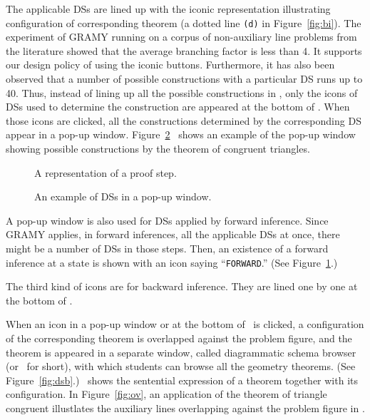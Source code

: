 The applicable DSs are lined up with the iconic representation
illustrating configuration of corresponding theorem (a dotted line
\texttt{(d)} in Figure~\ref{fig:bi}).  The experiment of GRAMY running
on a corpus of non-auxiliary line problems from the literature showed
that the average branching factor is less than 4.  It supports our
design policy of using the iconic buttons.  Furthermore, it has also
been observed that a number of possible constructions with a particular
DS runs up to 40.  Thus, instead of lining up all the possible
constructions in \StateView, only the icons of DSs used to determine the
construction are appeared at the bottom of \StateView.  When those icons
are clicked, all the constructions determined by the corresponding DS
appear in a pop-up window.  Figure~\ref{fig:popup}~ shows an example of
the pop-up window showing possible constructions by the theorem of
congruent triangles.

\begin{figure}[tb]
 \center
 \caption{A representation of a proof step.}
 \label{fig:sv}
\end{figure}

\begin{figure}[tb]
 \center
 \caption{An example of DSs in a pop-up window.}
 \label{fig:popup}
\end{figure}

A pop-up window is also used for DSs applied by forward inference.
Since GRAMY applies, in forward inferences, all the applicable DSs at
once, there might be a number of DSs in those steps.  Then, an existence
of a forward inference at a state is shown with an icon saying
``\texttt{FORWARD}.''  (See Figure~\ref{fig:sv}.)

The third kind of icons are for backward inference.  They are lined one
by one at the bottom of \StateView.

When an icon in a pop-up window or at the bottom of \StateView\ is
clicked, a configuration of the corresponding theorem is overlapped
against the problem figure, and the theorem is appeared in a separate
window, called diagrammatic schema browser (or \DsBrowser\ for short),
with which students can browse all the geometry theorems.  (See
Figure~\ref{fig:dsb}.)  \DsBrowser\ shows the sentential expression of a
theorem together with its configuration.  In Figure~\ref{fig:ov}, an
application of the theorem of triangle congruent illustlates the
auxiliary lines overlapping against the problem figure in \StateView.

